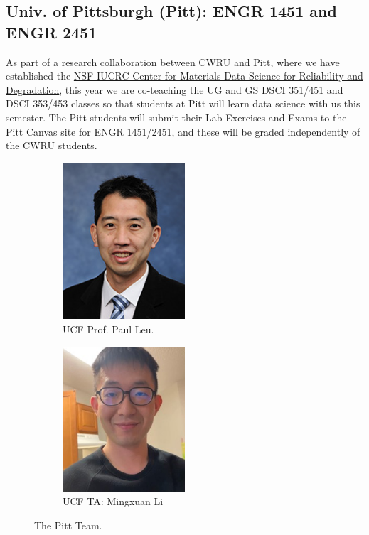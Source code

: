 \documentclass[10pt]{article} %
\begin{document}
  \subsection{Univ. of Pittsburgh (Pitt): ENGR 1451 and ENGR 2451}

    As part of a research collaboration between CWRU and Pitt, where we have established the \href{https://www.mds-rely.org}{NSF IUCRC Center for Materials Data Science for Reliability and Degradation}, this year we are co-teaching the UG and GS DSCI 351/451 and DSCI 353/453 classes so that students at Pitt will learn data science with us this semester.  The Pitt students will submit their Lab Exercises and Exams to the Pitt Canvas site for ENGR 1451/2451, and these will be graded independently of the CWRU students.

    \begin{figure}[htbp]
      \centering
      \begin{subfigure}{0.3\linewidth}
        \centering
        \includegraphics[width=0.5\textwidth]{figs/PaulLeu.jpg}
        \caption{UCF Prof. Paul Leu.}
        \label{fig:paul}
      \end{subfigure}
      \hfill
      \begin{subfigure}{0.3\linewidth}
        \centering
        \includegraphics[width=0.5\textwidth]{figs/MingxuanLi.jpeg}
        \caption{UCF TA: Mingxuan Li}
        \label{fig:mingxuan}
      \end{subfigure}
      \caption{The Pitt Team. }
      \label{fig:Pitt}
    \end{figure}
\end{document}
